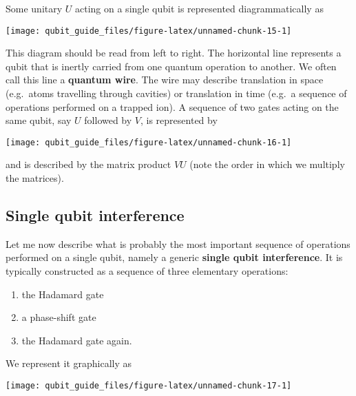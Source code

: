 \documentclass[fleqn]{article}
\providecommand{\tightlist}{%
  \setlength{\itemsep}{0pt}\setlength{\parskip}{0pt}}
\begin{document}
Some unitary \(U\) acting on a single qubit is represented diagrammatically as

\begin{center}\texttt{[image: qubit\_guide\_files/figure-latex/unnamed-chunk-15-1]} \end{center}

This diagram should be read from left to right.
The horizontal line represents a qubit that is inertly carried from one quantum operation to another.
We often call this line a \textbf{quantum wire}.
The wire may describe translation in space (e.g.~atoms travelling through cavities) or translation in time (e.g.~a sequence of operations performed on a trapped ion).
A sequence of two gates acting on the same qubit, say \(U\) followed by \(V\), is represented by

\begin{center}\texttt{[image: qubit\_guide\_files/figure-latex/unnamed-chunk-16-1]} \end{center}

and is described by the matrix product \(VU\) (note the order in which we multiply the matrices).

\hypertarget{single-qubit-interference}{%
\subsection{Single qubit interference}\label{single-qubit-interference}}

Let me now describe what is probably the most important sequence of operations performed on a single qubit, namely a generic \textbf{single qubit interference}.
It is typically constructed as a sequence of three elementary operations:

\begin{enumerate}
\def\labelenumi{\arabic{enumi}.}
\tightlist
\item
  the Hadamard gate
\item
  a phase-shift gate
\item
  the Hadamard gate again.
\end{enumerate}

We represent it graphically as

\begin{center}\texttt{[image: qubit\_guide\_files/figure-latex/unnamed-chunk-17-1]} \end{center}
\end{document}
